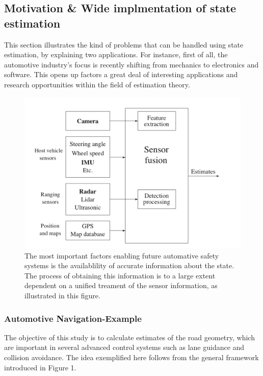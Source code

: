 \documentclass[11pt,oneside,a4paper]{article}
\begin{document}
\subsection{Motivation \& Wide implmentation of state estimation}
This section illustrates the kind of problems that can be handled using state estimation, by explaining two applications. For instance, first of all, the automotive industry's focus is recently shifting from mechanics to electronics and software. This opens up factors
a great deal of interesting applications and research opportunities within the field of estimation theory.
\begin{figure}[H]
  \begin{center}
  \includegraphics[height=0.3\textheight]{./source/PF/1.png}
  \end{center}
  \caption{ The most important factors enabling future automative safety systems
  is the availablility of accurate information about the state. The process of obtaining
  this information is to a large extent dependent on a unified treament of the sensor information, as illustrated
  in this figure.}
  \label{}
\end{figure}
\subsubsection{Automotive Navigation-Example}
The objective of this study is to calculate estimates of the road geometry,
which are important in several advanced control systems such as lane guidance
and collision avoidance. The idea exemplified here follows from the general framework introduced in Figure 1.
\end{document}
